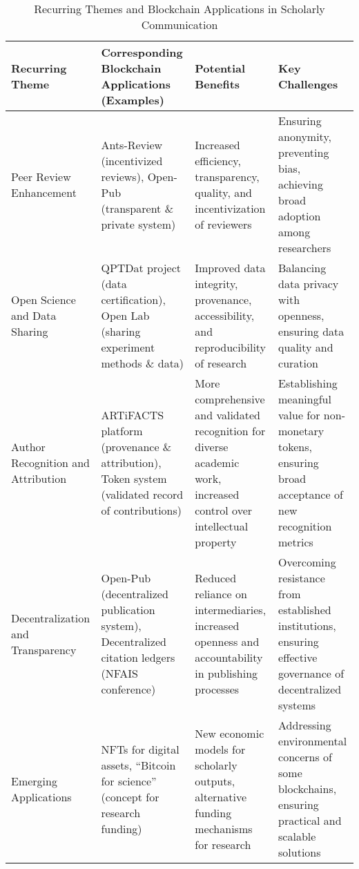 \documentclass{article}
\begin{document}
\begin{table}[ht]
    \centering
    \caption{Recurring Themes and Blockchain Applications in Scholarly Communication}
    \begin{tabularx}{\textwidth}{|X|X|X|X|}
        \hline
        \textbf{Recurring Theme}           & \textbf{Corresponding Blockchain Applications (Examples)}                                        & \textbf{Potential Benefits}                                                                                          & \textbf{Key Challenges}                                                                                     \\
        \hline
        Peer Review Enhancement            & Ants-Review (incentivized reviews), Open-Pub (transparent \& private system)                     & Increased efficiency, transparency, quality, and incentivization of reviewers                                        & Ensuring anonymity, preventing bias, achieving broad adoption among researchers                             \\
        \hline
        Open Science and Data Sharing      & QPTDat project (data certification), Open Lab (sharing experiment methods \& data)               & Improved data integrity, provenance, accessibility, and reproducibility of research                                  & Balancing data privacy with openness, ensuring data quality and curation                                    \\
        \hline
        Author Recognition and Attribution & ARTiFACTS platform (provenance \& attribution), Token system (validated record of contributions) & More comprehensive and validated recognition for diverse academic work, increased control over intellectual property & Establishing meaningful value for non-monetary tokens, ensuring broad acceptance of new recognition metrics \\
        \hline
        Decentralization and Transparency  & Open-Pub (decentralized publication system), Decentralized citation ledgers (NFAIS conference)   & Reduced reliance on intermediaries, increased openness and accountability in publishing processes                    & Overcoming resistance from established institutions, ensuring effective governance of decentralized systems \\
        \hline
        Emerging Applications              & NFTs for digital assets, ``Bitcoin for science'' (concept for research funding)                  & New economic models for scholarly outputs, alternative funding mechanisms for research                               & Addressing environmental concerns of some blockchains, ensuring practical and scalable solutions            \\
        \hline
    \end{tabularx}
\end{table}





\end{document}
